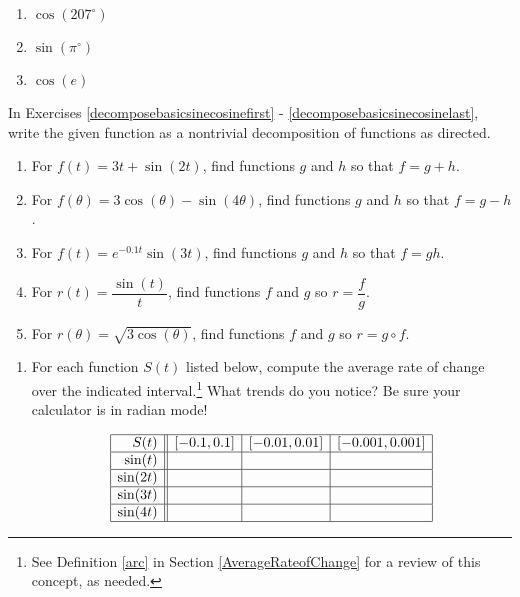\documentclass{ximera}
\begin{document}
\begin{multicols}{3}

\begin{enumerate}

\setcounter{enumi}{\value{HW}}

\item $\cos(207^{\circ})$
\item $\sin\left( \pi^{\circ} \right)$
\item $\cos(e)$ \label{calculatorlast} 

\setcounter{HW}{\value{enumi}}

\end{enumerate}

\end{multicols}

In Exercises \ref{decomposebasicsinecosinefirst} - \ref{decomposebasicsinecosinelast}, write the given function as a nontrivial decomposition of functions as directed.

\begin{enumerate}
\setcounter{enumi}{\value{HW}}

\item  For $f(t) = 3t + \sin(2t)$, find functions $g$ and $h$ so that $f=g+h$. \label{decomposebasicsinecosinefirst}
\item  For $f(\theta) = 3\cos(\theta) - \sin(4\theta)$, find functions $g$ and $h$ so that $f=g-h$. 
\item  For $f(t) = e^{-0.1t} \sin(3t)$, find functions $g$ and $h$ so that $f=gh$.
\item  For $r(t) = \dfrac{\sin(t)}{t}$, find functions $f$ and $g$ so $r = \dfrac{f}{g}$.
\item  For $r(\theta) =\sqrt{3 \cos(\theta)}$, find functions $f$ and $g$ so $r = g \circ f$. \label{decomposebasicsinecosinelast}

\setcounter{HW}{\value{enumi}}
\end{enumerate}

\begin{enumerate}
\setcounter{enumi}{\value{HW}}

\item \label{sinearcexercise}For each function $S(t)$ listed below, compute the average rate of change over the indicated interval.\footnote{See Definition \ref{arc} in Section \ref{AverageRateofChange} for a review of this concept, as needed.}  What trends do you notice? Be sure your calculator is in radian mode!

\[ \begin{array}{|r||c|c|c|}  \hline

 S(t) &  [-0.1, 0.1] & [-0.01, 0.01] &[-0.001, 0.001] \\ \hline
 \sin(t)     &&&  \\  \hline
 \sin(2t)   &&&  \\ \hline
 \sin(3t)   &&&   \\  \hline
\sin(4t)   &&&   \\  \hline

\end{array} \]

\setcounter{HW}{\value{enumi}}
\end{enumerate}
\end{document}
